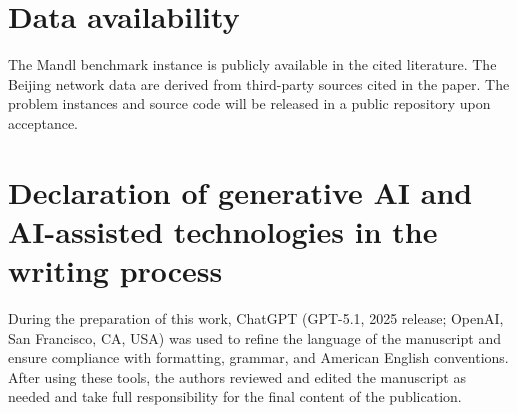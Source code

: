 \documentclass[a4paper,fleqn]{cas-sc}
\begin{document}






\section*{Data availability}
The Mandl benchmark instance is publicly available in the cited literature. The Beijing network data are derived from third-party sources cited in the paper. The problem instances and source code will be released in a public repository upon acceptance.

\section*{Declaration of generative AI and AI-assisted technologies in the writing process}
During the preparation of this work, ChatGPT (GPT-5.1, 2025 release; OpenAI, San Francisco, CA, USA) was used to refine the language of the manuscript and ensure compliance with formatting, grammar, and American English conventions. After using these tools, the authors reviewed and edited the manuscript as needed and take full responsibility for the final content of the publication.
\end{document}
